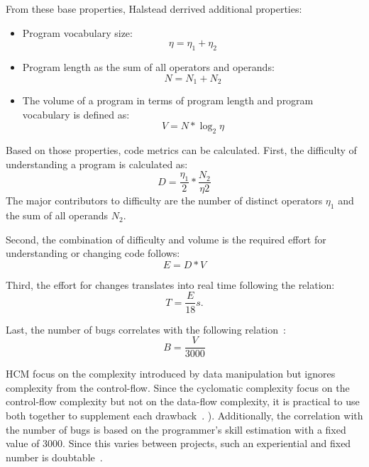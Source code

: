 From these base properties, Halstead derrived additional properties:
\begin{itemize}
    \item Program vocabulary size:
    \begin{displaymath}
        \eta = \eta_1 + \eta_2
    \end{displaymath}
    \item Program length as the sum of all operators and operands:
    \begin{displaymath}
        N = N_1 + N_2
    \end{displaymath}
    \item The volume of a program in terms of program length and program vocabulary is defined as: 
    \begin{displaymath}
        V = N * \log_2{\eta}
    \end{displaymath}
\end{itemize}

Based on those properties, code metrics can be calculated. 
First, the difficulty of understanding a program is calculated as:
\begin{displaymath}
    D = \frac{\eta_1}{2} * \frac{N_2}{\eta2}
\end{displaymath}
The major contributors to difficulty are the number of distinct operators $\eta_1$ and the sum of all operands $N_2$.

Second, the combination of difficulty and volume is the required effort for understanding or changing code follows:
\begin{displaymath}
    E = D * V
\end{displaymath}

Third, the effort for changes translates into real time following the relation:
\begin{displaymath}
    T = \frac{E}{18}s.
\end{displaymath}

Last, the number of bugs correlates with the following relation~\cite{yu_survey_2010}:
\begin{displaymath}
    B = \frac{V}{3000}
\end{displaymath}

HCM focus on the complexity introduced by data manipulation but ignores complexity from the control-flow. Since the cyclomatic complexity focus on the control-flow complexity but not on the data-flow complexity, it is practical to use both together to supplement each drawback~\cite{yu_survey_2010}.
). Additionally, the correlation with the number of bugs is based on the programmer's skill estimation with a fixed value of 3000. Since this varies between projects, such an experiential and fixed number is doubtable~\cite{yu_survey_2010}.

